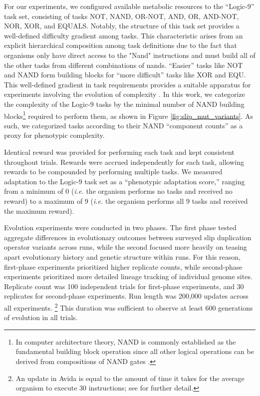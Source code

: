 For our experiments, we configured available metabolic resources to the ``Logic-9'' task set, consisting of tasks NOT, NAND, OR-NOT, AND, OR, AND-NOT, NOR, XOR, and EQUALS.
Notably, the structure of this task set provides a well-defined difficulty gradient among tasks.
This characteristic arises from an explicit hierarchical composition among task definitions due to the fact that organisms only have direct access to the "Nand" instructions and must build all of the other tasks from different combinations of nands.
``Easier'' tasks like NOT and NAND form building blocks for ``more difficult'' tasks like XOR and EQU.
This well-defined gradient in task requirements provides a suitable apparatus for experiments involving the evolution of complexity \citep{lenski2003evolutionary}.
In this work, we categorize the complexity of the Logic-9 tasks by the minimal number of NAND building blocks\footnote{
In computer architecture theory, NAND is commonly established as the fundamental building block operation since all other logical operations can be derived from compositions of NAND gates \citep{mano1997logic}.
} required to perform them, as shown in Figure \ref{fig:slip_mut_variants}.
As such, we categorized tasks according to their NAND ``component counts'' as a proxy for phenotypic complexity.

Identical reward was provided for performing each task and kept consistent throughout trials.
Rewards were accrued independently for each task, allowing rewards to be compounded by performing multiple tasks.
We measured adaptation to the Logic-9 task set as a ``phenotypic adaptation score,'' ranging from a minimum of 0 (\textit{i.e.} the organism performs no tasks and received no reward) to a maximum of 9 (\textit{i.e.} the organism performs all 9 tasks and received the maximum reward).

Evolution experiments were conducted in two phases.
The first phase tested aggregate differences in evolutionary outcomes between surveyed slip duplication operator variants across runs, while the second focused more heavily on teasing apart evolutionary history and genetic structure within runs.
For this reason, first-phase experiments prioritized higher replicate counts, while second-phase experiments prioritized more detailed lineage tracking of individual genome sites.
Replicate count was 100 independent trials for first-phase experiments, and 30 replicates for second-phase experiments.
Run length was 200,000 updates across all experiments.
\footnote{An update in Avida is equal to the amount of time it takes for the average organism to execute 30 instructions; see \citep{Ofria:2009avida} for further detail.}
This duration was sufficient to observe at least 600 generations of evolution in all trials.

